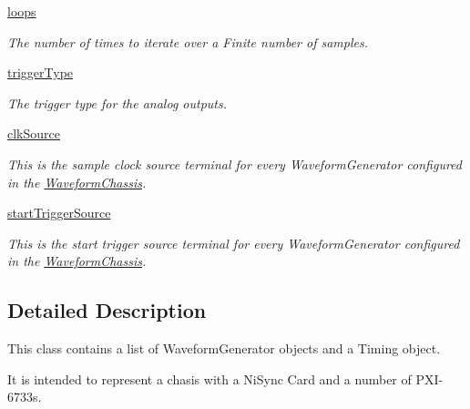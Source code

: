 \begin{DoxyCompactItemize}
\hyperlink{class_waveform_chassis_1_1_waveform_chassis_ab1d1e2c6f2742589ae187a6d12c26565}{loops}
\begin{DoxyCompactList}\small\item\em The number of times to iterate over a Finite number of samples. \end{DoxyCompactList}\item 
\hyperlink{class_waveform_chassis_1_1_waveform_chassis_af6dd8a668436712fc2cc9dab2fc8ef6f}{trigger\-Type}
\begin{DoxyCompactList}\small\item\em The trigger type for the analog outputs. \end{DoxyCompactList}\item 
\hyperlink{class_waveform_chassis_1_1_waveform_chassis_a5914d44a4e532bed3845206318dd8407}{clk\-Source}
\begin{DoxyCompactList}\small\item\em This is the sample clock source terminal for every Waveform\-Generator configured in the \hyperlink{class_waveform_chassis_1_1_waveform_chassis}{Waveform\-Chassis}. \end{DoxyCompactList}\item 
\hyperlink{class_waveform_chassis_1_1_waveform_chassis_a73f6eace1feef22a221d458a3809c338}{start\-Trigger\-Source}
\begin{DoxyCompactList}\small\item\em This is the start trigger source terminal for every Waveform\-Generator configured in the \hyperlink{class_waveform_chassis_1_1_waveform_chassis}{Waveform\-Chassis}. \end{DoxyCompactList}\end{DoxyCompactItemize}


\subsection{Detailed Description}
This class contains a list of Waveform\-Generator objects and a Timing object. 

It is intended to represent a chasis with a Ni\-Sync Card and a number of P\-X\-I-\/6733s. 

